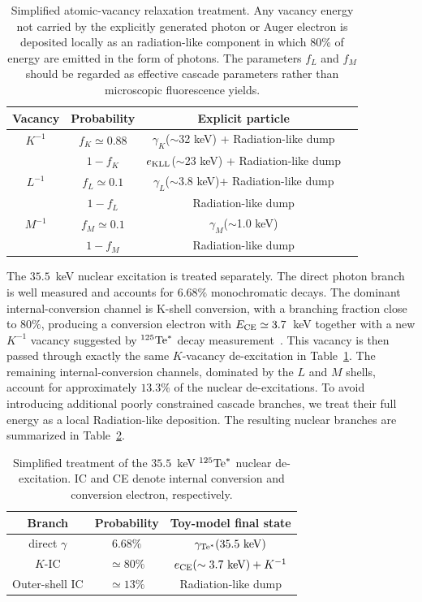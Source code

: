 \documentclass[11pt,a4paper]{article}
\begin{document}
\begin{table}[h!]
\centering
\begin{tabular}{cccc}
\hline
Vacancy  & Probability & Explicit particle \\
\hline
$K^{-1}$ &  $f_K\simeq0.88$ & $\gamma_K$($\sim$32 keV) + Radiation-like dump\\
          & $1-f_K$ & $e_{\rm KLL}$($\sim$23 keV) + Radiation-like dump \\
$L^{-1}$  & $f_L\simeq 0.1$ & $\gamma_L$($\sim$3.8 keV)+ Radiation-like dump \\
          & $1-f_L$ &  Radiation-like dump \\
$M^{-1}$  & $f_M\simeq 0.1$ & $\gamma_M$($\sim$1.0 keV) \\
          & $1-f_M$ &  Radiation-like dump \\
\hline
\end{tabular}
\caption{Simplified atomic-vacancy relaxation treatment. Any vacancy energy not carried by the explicitly generated photon or Auger electron is deposited locally as an radiation-like component in which 80\% of energy are emitted in the form of photons. The parameters $f_L$ and $f_M$ should be regarded as effective cascade parameters rather than microscopic fluorescence yields.}
\label{tab:i125_vacancy}
\end{table}

The $35.5$~keV nuclear excitation is treated separately. The direct photon branch is well measured and accounts for $6.68\%$ monochromatic decays. The dominant internal-conversion channel is K-shell conversion, with a branching fraction close to $80\%$, producing a conversion electron with $E_{\rm CE}\simeq3.7$~keV together with a new $K^{-1}$ vacancy suggested by $^{125}{\rm Te}^*$ decay measurement~\cite{Bowe1952}. This vacancy is then passed through exactly the same $K$-vacancy de-excitation in Table~\ref{tab:i125_vacancy}. The remaining internal-conversion channels, dominated by the $L$ and $M$ shells, account for approximately $13.3\%$ of the nuclear de-excitations. To avoid introducing additional poorly constrained cascade branches, we treat their full energy as a local Radiation-like deposition. The resulting nuclear branches are summarized in Table~\ref{tab:i125_te}.

\begin{table}[h!]
\centering
\begin{tabular}{ccc}
\hline
Branch & Probability & Toy-model final state \\
\hline
direct $\gamma$ & $6.68\%$ & $\gamma_{\rm Te^\ast}(35.5~{\rm keV})$ \\
$K$-IC & $\simeq80\%$ & $e_{\rm CE}(\sim 3.7~{\rm keV})+K^{-1}$ \\
Outer-shell IC & $\simeq13\%$ & Radiation-like dump \\
\hline
\end{tabular}
\caption{Simplified treatment of the $35.5$~keV $^{125}{\rm Te}^{*}$ nuclear de-excitation. IC and CE denote internal conversion and conversion electron, respectively.}
\label{tab:i125_te}
\end{table}
\end{document}
